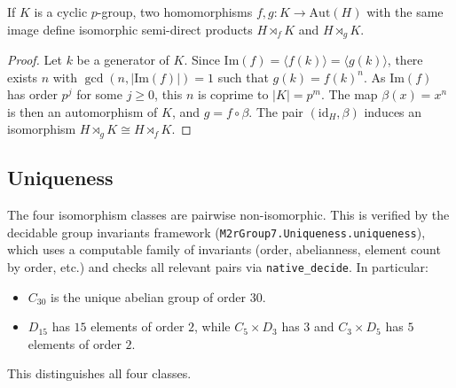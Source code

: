 \begin{lemma}\label{equal_image_iso_sdp}
If $K$ is a cyclic $p$-group, two homomorphisms $f, g : K \to \mathrm{Aut}(H)$
with the same image define isomorphic semi-direct products $H \rtimes_f K$ and
$H \rtimes_g K$.
\end{lemma}

\begin{proof}
Let $k$ be a generator of $K$. Since $\mathrm{Im}(f) = \langle f(k) \rangle =
\langle g(k) \rangle$, there exists $n$ with $\gcd(n, |\mathrm{Im}(f)|) = 1$
such that $g(k) = f(k)^n$. As $\mathrm{Im}(f)$ has order $p^j$ for some $j \geq 0$,
this $n$ is coprime to $|K| = p^m$. The map $\beta(x) = x^n$ is then an
automorphism of $K$, and $g = f \circ \beta$. The pair $(\mathrm{id}_H, \beta)$
induces an isomorphism $H \rtimes_g K \cong H \rtimes_f K$.
\end{proof}

\subsection{Uniqueness}

The four isomorphism classes are pairwise non-isomorphic. This is verified by
the decidable group invariants framework
(\verb|M2rGroup7.Uniqueness.uniqueness|), which uses a computable family of
invariants (order, abelianness, element count by order, etc.) and checks all
relevant pairs via \verb|native_decide|. In particular:
\begin{itemize}
  \item $C_{30}$ is the unique abelian group of order $30$.
  \item $D_{15}$ has $15$ elements of order $2$, while $C_5 \times D_3$ has
        $3$ and $C_3 \times D_5$ has $5$ elements of order $2$.
\end{itemize}
This distinguishes all four classes.


